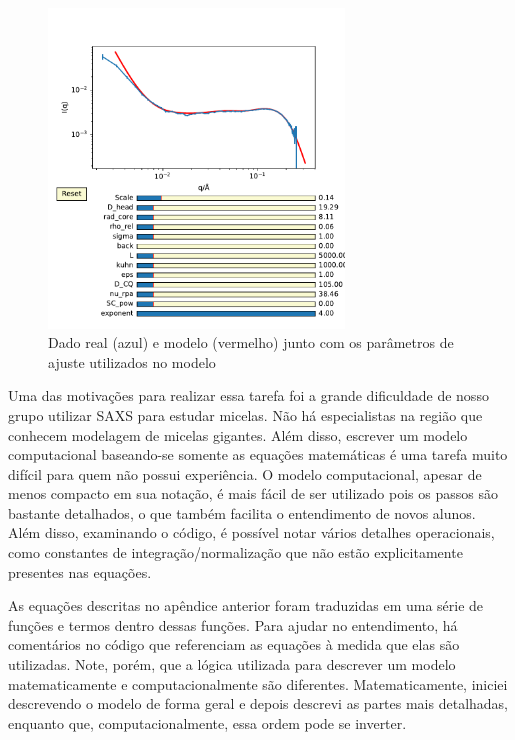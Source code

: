 \begin{apendicesenv}
\begin{figure}[h]
	\centering
	\includegraphics[width=0.7\textwidth]{imagens/saxs/Modelo_dado_SAXS_python}
	\caption{Dado real (azul) e modelo (vermelho) junto com os parâmetros de ajuste utilizados no modelo}
	\label{fig:saxs_modelo_dado_saxs_python}
\end{figure}

Uma das motivações para realizar essa tarefa foi a grande dificuldade de nosso grupo utilizar SAXS para estudar micelas. Não há especialistas na região que conhecem modelagem de micelas gigantes. Além disso, escrever um modelo computacional baseando-se somente as equações matemáticas é uma tarefa muito difícil para quem não possui experiência. O modelo computacional, apesar de menos compacto em sua notação, é mais fácil de ser utilizado pois os passos são bastante detalhados, o que também facilita o entendimento de novos alunos. Além disso, examinando o código, é possível notar vários detalhes operacionais, como constantes de integração/normalização que não estão explicitamente presentes nas equações.

As equações descritas no apêndice anterior foram traduzidas em uma série de funções e termos dentro dessas funções. Para ajudar no entendimento, há comentários no código que referenciam as equações à medida que elas são utilizadas. Note, porém, que a lógica utilizada para descrever um modelo matematicamente e computacionalmente são diferentes. Matematicamente, iniciei descrevendo o modelo de forma geral e depois descrevi as partes mais detalhadas, enquanto que, computacionalmente, essa ordem pode se inverter.


\end{apendicesenv}
